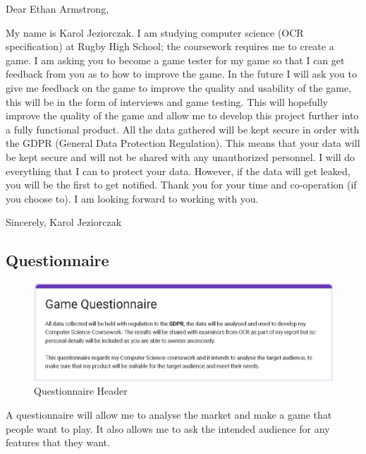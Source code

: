 \documentclass{article}
\newcommand{\parBr}{\vspace{5mm}}%
\begin{document}
Dear Ethan Armstrong, 

\parBr

\begin{flushleft}
My name is Karol Jeziorczak. I am studying computer science (OCR specification) at Rugby High School; the coursework requires me to create a game. \linebreak
I am asking you to become a game tester for my game so that I can get feedback from you as to how to improve the game. In the future I will ask you to give me feedback on the game to improve the quality and usability of the game, this will be in the form of interviews and game testing. This will hopefully improve the quality of the game and allow me to develop this project further into a fully functional product. \linebreak
All the data gathered will be kept secure in order with the GDPR (General Data Protection Regulation). This means that your data will be kept secure and will not be shared with any unauthorized personnel. I will do everything that I can to protect your data. However, if the data will get leaked, you will be the first to get notified.  \linebreak
Thank you for your time and co-operation (if you choose to). I am looking forward to working with you.
 
\parBr

Sincerely, \linebreak Karol Jeziorczak
\end{flushleft}

\subsection{Questionnaire}
\begin{figure}[h]
\includegraphics[scale=0.65]{Questionnaire Screenshot}
\caption{Questionnaire Header}
\end{figure}

A questionnaire will allow me to analyse the market and make a game that people want to play. It also allows me to ask the intended audience for any features that they want.
\end{document}
